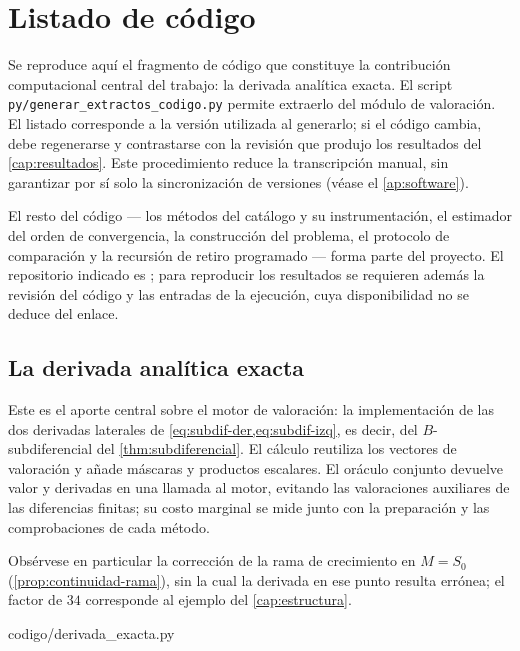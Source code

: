 \chapter{Listado de código}
\label{ap:codigo}

Se reproduce aquí el fragmento de código que constituye la contribución
computacional central del trabajo: la derivada analítica exacta. El script
\texttt{py/generar\_extractos\_codigo.py} permite extraerlo del módulo de
valoración. El listado corresponde a la versión utilizada al generarlo; si el
código cambia, debe regenerarse y contrastarse con la revisión que produjo los
resultados del \cref{cap:resultados}. Este procedimiento reduce la
transcripción manual, sin garantizar por sí solo la sincronización de versiones
(véase el \cref{ap:software}).

El resto del código --- los \datoNMetodos{} métodos del catálogo y su
instrumentación, el estimador del orden de convergencia, la construcción del
problema, el protocolo de comparación y la recursión de retiro programado ---
forma parte del proyecto. El repositorio indicado es \repositorio; para
reproducir los resultados se requieren además la revisión del código y las
entradas de la ejecución, cuya disponibilidad no se deduce del enlace.

\section{La derivada analítica exacta}
\label{sec:cod-derivada}

Este es el aporte central sobre el motor de valoración: la implementación de las
dos derivadas laterales de \cref{eq:subdif-der,eq:subdif-izq}, es decir, del
$B$-subdiferencial del \cref{thm:subdiferencial}. El cálculo reutiliza los
vectores de valoración y añade máscaras y productos escalares. El oráculo conjunto
devuelve valor y derivadas en una llamada al motor, evitando las valoraciones
auxiliares de las diferencias finitas; su costo marginal se mide junto con la
preparación y las comprobaciones de cada método.

Obsérvese en particular la corrección de la rama de crecimiento en $M=S_0$
(\cref{prop:continuidad-rama}), sin la cual la derivada en ese punto resulta
errónea; el factor de $34$ corresponde al ejemplo del \cref{cap:estructura}.

%
{codigo/derivada_exacta.py}

